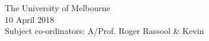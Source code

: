 \begin{titlepage}
\begin{center}
\vspace{1.0cm}

The University of Melbourne
\\[0.5cm]

{\large 10 April 2018}
\\[1.5cm]

Subject co-ordinators: A/Prof. Roger Rassool \& Kevin
\\[0.8cm]


\end{center}
\end{titlepage}
